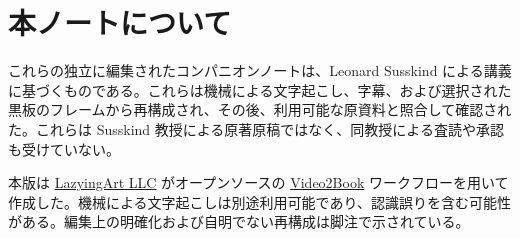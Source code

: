 \documentclass[11pt,oneside]{book}
\begin{document}
\frontmatter
\hypersetup{pageanchor=false}

\hypersetup{pageanchor=true}

\clearpage
\chapter*{本ノートについて}
これらの独立に編集されたコンパニオンノートは、Leonard Susskind による講義に基づくものである。これらは機械による文字起こし、字幕、および選択された黒板のフレームから再構成され、その後、利用可能な原資料と照合して確認された。これらは Susskind 教授による原著原稿ではなく、同教授による査読や承認も受けていない。

本版は \href{https://lazying.art}{LazyingArt LLC} がオープンソースの \href{https://github.com/lachlanchen/Video2Book}{Video2Book} ワークフローを用いて作成した。機械による文字起こしは別途利用可能であり、認識誤りを含む可能性がある。編集上の明確化および自明でない再構成は脚注で示されている。
\clearpage
\tableofcontents
\mainmatter










\end{document}
